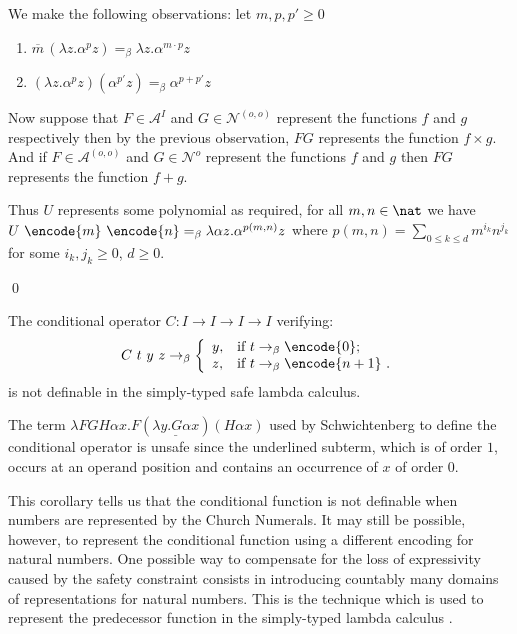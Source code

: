 {We make the following observations: let $m, p, p' \geq 0$
\begin{enumerate}
\item ${\overline m} \, (\lambda z.\alpha^p z) =_\beta \lambda z . \alpha^{m \cdot p} z$
\item $(\lambda z.\alpha^p z) (\alpha^{p'} z) =_\beta \alpha^{p + p'} z$
\end{enumerate}

Now suppose that $F\in \mathcal{A}^I$ and
$G\in \mathcal{N}^{(o,o)}$ represent the functions
$f$ and $g$ respectively then by the previous observation, $F G$ represents
the function $f \times g$.
And if $F\in \mathcal{A}^{(o,o)}$ and
$G\in \mathcal{N}^o$ represent the functions
$f$ and $g$ then $F G$ represents
the function $f+g$.

Thus $U$ represents some polynomial as required, \ie
for all $m,n\in \nat$ we have
$U~\encode{m}~\encode{n} =_\beta \lambda \alpha z .  \alpha^{p(m,n)} z$ where
$p(m,n) = \sum_{0\leq k \leq d} m^{i_k} n^{j_k}$ for some $i_k,j_k
\geq 0$, $d\geq 0$.
}

\qed

\begin{corollary}
The conditional operator $C:I\rightarrow I\rightarrow I \rightarrow
I$ verifying:
$$
C~t~y~z \rightarrow_\beta \left\{
                            \begin{array}{ll}
                              y, & \hbox{if $t
\rightarrow_\beta \encode{0}$;} \\
                              z, & \hbox{if
$t \rightarrow_\beta \encode{n+1}$ .}
                            \end{array}
                          \right.
$$
is not definable in the simply-typed safe lambda calculus.
\end{corollary}

\begin{example}
The term $\lambda F G H \alpha x . F ( \underline{\lambda y . G
\alpha x} ) (H \alpha x)$ used by Schwichtenberg
\cite{citeulike:622637} to define the conditional operator is unsafe
since the underlined subterm, which is of order $1$, occurs at an
operand position and contains an occurrence of $x$ of order $0$.
\end{example}

This corollary tells us that the conditional function is not
definable when numbers are represented by the Church Numerals. It
may still be possible, however, to represent the conditional
function using a different encoding for natural numbers. One
possible way to compensate for the loss of expressivity caused by
the safety constraint consists in introducing countably many domains
of representations for natural numbers. This is the technique which
is used to represent the predecessor function in the simply-typed
lambda calculus \cite{DBLP:journals/jacm/FortuneLO83}.

